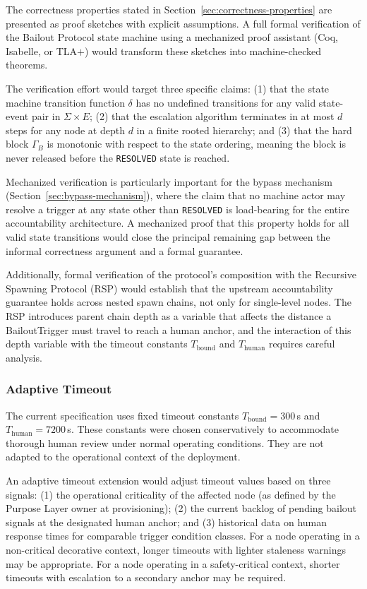 \documentclass[12pt]{article}
\begin{document}
The correctness properties stated in Section~\ref{sec:correctness-properties} are presented as proof sketches with explicit assumptions. A full formal verification of the Bailout Protocol state machine using a mechanized proof assistant (Coq, Isabelle, or TLA$+$) would transform these sketches into machine-checked theorems.

The verification effort would target three specific claims: (1) that the state machine transition function $\delta$ has no undefined transitions for any valid state-event pair in $\Sigma \times E$; (2) that the escalation algorithm terminates in at most $d$ steps for any node at depth $d$ in a finite rooted hierarchy; and (3) that the hard block $\Gamma_B$ is monotonic with respect to the state ordering, meaning the block is never released before the \texttt{RESOLVED} state is reached.

Mechanized verification is particularly important for the bypass mechanism (Section~\ref{sec:bypass-mechanism}), where the claim that no machine actor may resolve a trigger at any state other than \texttt{RESOLVED} is load-bearing for the entire accountability architecture. A mechanized proof that this property holds for all valid state transitions would close the principal remaining gap between the informal correctness argument and a formal guarantee.

Additionally, formal verification of the protocol's composition with the Recursive Spawning Protocol (RSP) would establish that the upstream accountability guarantee holds across nested spawn chains, not only for single-level nodes. The RSP introduces parent chain depth as a variable that affects the distance a BailoutTrigger must travel to reach a human anchor, and the interaction of this depth variable with the timeout constants $T_{\text{bound}}$ and $T_{\text{human}}$ requires careful analysis.

\subsubsection{Adaptive Timeout}\label{sec:adaptive-timeout}

The current specification uses fixed timeout constants $T_{\text{bound}}=300$\,s and $T_{\text{human}}=7200$\,s. These constants were chosen conservatively to accommodate thorough human review under normal operating conditions. They are not adapted to the operational context of the deployment.

An adaptive timeout extension would adjust timeout values based on three signals: (1) the operational criticality of the affected node (as defined by the Purpose Layer owner at provisioning); (2) the current backlog of pending bailout signals at the designated human anchor; and (3) historical data on human response times for comparable trigger condition classes. For a node operating in a non-critical decorative context, longer timeouts with lighter staleness warnings may be appropriate. For a node operating in a safety-critical context, shorter timeouts with escalation to a secondary anchor may be required.
\end{document}
